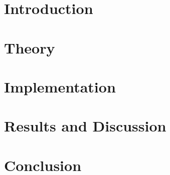 \documentclass[11pt, tightTitle]{thelongcat-report}
\begin{document}
\maketitle

\begin{abstract}
	\label{sec:abstract}
	
\end{abstract}

\begin{multicols}{2}
	\section{Introduction}
	\label{sec:introduction}
	

	\section{Theory}
	\label{sec:theory}
	

	\section{Implementation}
	\label{sec:implementation}
	

	\section{Results and Discussion}
	\label{sec:results}
	

	\section{Conclusion}
	\label{sec:conclusion}
	

	\printbibliography
\end{multicols}

\appendix
{}
\end{document}
